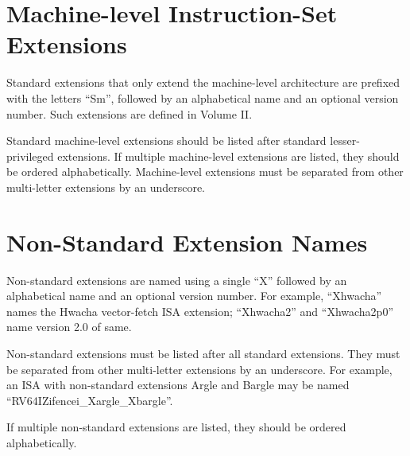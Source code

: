 \section{Machine-level Instruction-Set Extensions}

Standard extensions that only extend the machine-level architecture are
prefixed with the letters ``Sm'', followed by an alphabetical name and
an optional version number.  Such extensions are defined in Volume
II.

Standard machine-level extensions should be listed after standard
lesser-privileged extensions.  If multiple machine-level extensions are listed,
they should be ordered alphabetically.  Machine-level extensions must be
separated from other multi-letter extensions by an underscore.

\section{Non-Standard Extension Names}

Non-standard extensions are named using a single ``X'' followed by an
alphabetical name and an optional version number.
For example, ``Xhwacha'' names the Hwacha vector-fetch ISA extension;
``Xhwacha2'' and ``Xhwacha2p0'' name version 2.0 of same.

Non-standard extensions must be listed after all standard extensions.
They must be separated from other multi-letter extensions
by an underscore.  For example, an ISA with non-standard extensions
Argle and Bargle may be named ``RV64IZifencei\_Xargle\_Xbargle''.

If multiple non-standard extensions are listed, they should be ordered
alphabetically.

